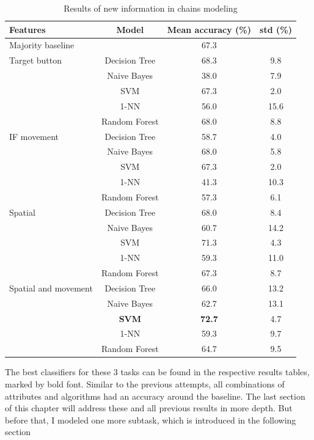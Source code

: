 \begin{table}[!htbp]
 \centering
\begin{tabular}{lccc}
\toprule
Features & Model    & Mean accuracy (\%) &  std (\%) \\
\midrule
 Majority baseline  &   & 67.3	& \\
\midrule
Target button 	& Decision Tree 	& 68.3	& 9.8 	\\
				& Naive Bayes  	& 38.0	& 7.9	\\
				& SVM 			& 67.3	& 2.0 	\\
				& 1-NN			& 56.0	& 15.6 	\\
				& Random Forest	& 68.0	& 8.8	\\
\midrule
IF movement	& Decision Tree 	& 	58.7	& 4.0 \\
			& Naive Bayes  	&	68.0	& 5.8	\\
			& SVM 			&	67.3	& 2.0 	\\
			& 1-NN			&	41.3	& 10.3 	\\
			& Random Forest	&	57.3& 6.1 	\\
			
\midrule
Spatial	 	& Decision Tree 	& 68.0	& 8.4 \\
			& Naive Bayes  	& 60.7 	& 14.2	\\
			& SVM 			& 71.3	& 4.3 	\\
			& 1-NN			& 59.3	& 11.0 \\
			& Random Forest	& 67.3	& 8.7 \\	

\midrule
Spatial and movement& Decision Tree 	& 66.0	& 13.2 \\
					& Naive Bayes  	& 62.7	& 13.1	\\
					& \textbf{SVM} 	& \textbf{72.7}	& 4.7 	\\
					& 1-NN			& 59.3	& 9.7 \\
					& Random Forest	& 64.7	& 9.5 \\	 	
\bottomrule
\end{tabular}
\caption{Results of new information in chains modeling}
\label{tab:chains-ml-infgain}
\end{table}

The best classifiers for these 3 tasks can be found in the respective results tables, marked by bold font. Similar to the previous attempts, all combinations of attributes and algorithms had an accuracy around the baseline. The last section of this chapter will address these and all previous results in more depth. But before that, I modeled one more subtask, which is introduced in the following section


